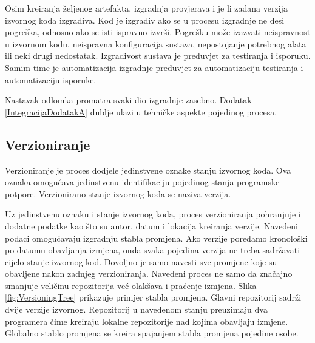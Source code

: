\documentclass[times, utf8, diplomski, numeric]{fer}
\begin{document}
Osim kreiranja željenog artefakta, izgradnja provjerava i je li zadana verzija izvornog koda izgradiva. Kod je izgradiv ako se u procesu izgradnje ne desi pogreška, odnosno ako se isti ispravno izvrši. Pogrešku može izazvati neispravnost u izvornom kodu, neispravna konfiguracija sustava, nepostojanje potrebnog alata ili neki drugi nedostatak. Izgradivost sustava je preduvjet za  testiranja i isporuku. Samim time je automatizacija izgradnje preduvjet za automatizaciju testiranja i automatizaciju isporuke.

Nastavak odlomka promatra svaki dio izgradnje zasebno. Dodatak \ref{IntegracijaDodatakA} dublje ulazi u tehničke aspekte pojedinog procesa.

\subsection{Verzioniranje}

Verzioniranje je proces dodjele jedinstvene oznake stanju izvornog koda\citep{wiki:SoftwareVersioning}. Ova oznaka omogućava jedinstvenu identifikaciju pojedinog stanja programske potpore. Verzionirano stanje izvornog koda se naziva verzija.

Uz jedinstvenu oznaku i stanje izvornog koda, proces verzioniranja pohranjuje i dodatne podatke kao što su autor, datum i lokacija kreiranja verzije. Navedeni podaci omogućavaju izgradnju stabla promjena. Ako verzije poredamo kronološki po datumu obavljanja izmjena, onda svaka pojedina verzija ne treba sadržavati cijelo stanje izvornog kod. Dovoljno je samo navesti sve promjene koje su obavljene nakon zadnjeg verzioniranja. Navedeni proces ne samo da značajno smanjuje veličinu repozitorija već olakšava i praćenje izmjena. Slika \ref{fig:VersioningTree} prikazuje primjer stabla promjena. Glavni repozitorij sadrži dvije verzije izvornog. Repozitorij u navedenom stanju preuzimaju dva programera čime kreiraju lokalne repozitorije nad kojima obavljaju izmjene. Globalno stablo promjena se kreira spajanjem stabla promjena pojedine osobe.
\end{document}
